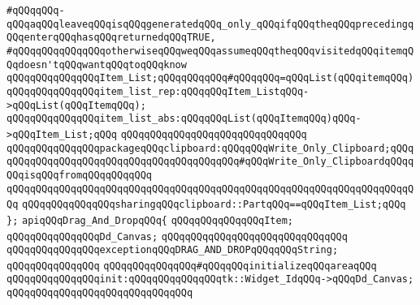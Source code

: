 \verb|#qQQqqQQq-qQQqaqQQqleaveqQQqisqQQqgeneratedqQQq_only_qQQqifqQQqtheqQQqprecedingqQQqenterqQQqhasqQQqreturnedqQQqTRUE,|\newline
\verb|#qQQqqQQqqQQqqQQqotherwiseqQQqweqQQqassumeqQQqtheqQQqvisitedqQQqitemqQQqdoesn'tqQQqwantqQQqtoqQQqknow|\newline
\newline
\newline
\newline
\verb|qQQqqQQqqQQqqQQqItem_List;qQQqqQQqqQQq#qQQqqQQq=qQQqList(qQQqitemqQQq)|\newline
\newline
\verb|qQQqqQQqqQQqqQQqitem_list_rep:qQQqqQQqItem_ListqQQq->qQQqList(qQQqItemqQQq);|\newline
\verb|qQQqqQQqqQQqqQQqitem_list_abs:qQQqqQQqList(qQQqItemqQQq)qQQq->qQQqItem_List;qQQq|\newline
\verb|qQQqqQQqqQQqqQQqqQQqqQQqqQQqqQQq|\newline
\verb|qQQqqQQqqQQqqQQqpackageqQQqclipboard:qQQqqQQqWrite_Only_Clipboard;qQQqqQQqqQQqqQQqqQQqqQQqqQQqqQQqqQQqqQQqqQQq#qQQqWrite_Only_ClipboardqQQqqQQqisqQQqfromqQQqqQQqqQQq|\newline
\verb|qQQqqQQqqQQqqQQqqQQqqQQqqQQqqQQqqQQqqQQqqQQqqQQqqQQqqQQqqQQqqQQqqQQqqQQq|\newline
\verb|qQQqqQQqqQQqqQQqsharingqQQqclipboard::PartqQQq==qQQqItem_List;qQQq|\newline
\newline
\verb|};|\newline
\newline
\newline
\verb|apiqQQqDrag_And_DropqQQq{|\newline
\newline
\verb|qQQqqQQqqQQqqQQqItem;|\newline
\verb|qQQqqQQqqQQqqQQqDd_Canvas;|\newline
\verb|qQQqqQQqqQQqqQQqqQQqqQQqqQQqqQQq|\newline
\verb|qQQqqQQqqQQqqQQqexceptionqQQqDRAG_AND_DROPqQQqqQQqString;|\newline
\verb|qQQqqQQqqQQqqQQq|\newline
\verb|qQQqqQQqqQQqqQQq#qQQqqQQqinitializeqQQqareaqQQq|\newline
\verb|qQQqqQQqqQQqqQQqinit:qQQqqQQqqQQqqQQqtk::Widget_IdqQQq->qQQqDd_Canvas;|\newline
\verb|qQQqqQQqqQQqqQQqqQQqqQQqqQQqqQQq|\newline
